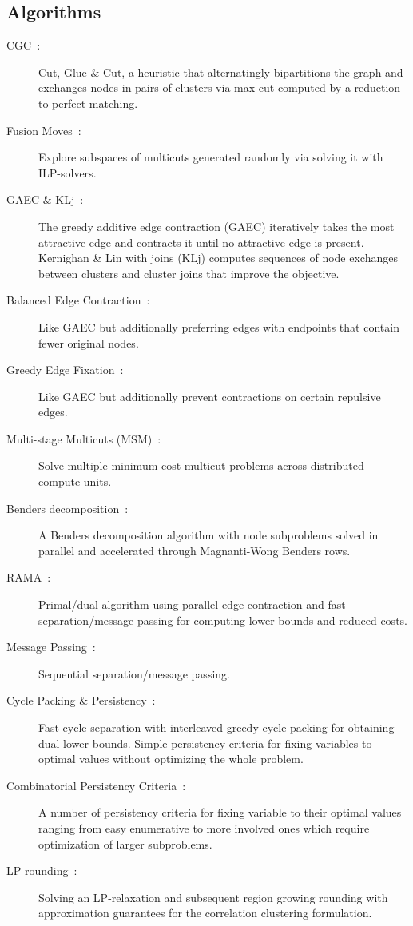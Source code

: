 \subsection{Algorithms}
\begin{description}
\item[CGC~\cite{beier2014cut}:] Cut, Glue \& Cut, a heuristic that alternatingly bipartitions the graph and exchanges nodes in pairs of clusters via max-cut computed by a reduction to perfect matching.
\item[Fusion Moves~\cite{beier2017multicut}:] Explore subspaces of multicuts generated randomly via solving it with ILP-solvers.
\item[GAEC \& KLj~\cite{keuper2015efficient}:] The greedy additive edge contraction (GAEC) iteratively takes the most attractive edge and contracts it until no attractive edge is present.
Kernighan \& Lin with joins (KLj) computes sequences of node exchanges between clusters and cluster joins that improve the objective.
\item[Balanced Edge Contraction~\cite{kardoost2018solving}:] Like GAEC but additionally preferring edges with endpoints that contain fewer original nodes.
\item[Greedy Edge Fixation~\cite{levinkov2019comparative}:] Like GAEC but additionally prevent contractions on certain repulsive edges.
\item[Multi-stage Multicuts (MSM)~\cite{ho2021msm}:] Solve multiple minimum cost multicut problems across distributed compute units.
\item[Benders decomposition~\cite{lukasik2020benders}:] A Benders decomposition algorithm with node subproblems solved in parallel and accelerated through Magnanti-Wong Benders rows.
\item[RAMA~\cite{abbas2021combinatorial}:] Primal/dual algorithm using parallel edge contraction and fast separation/message passing for computing lower bounds and reduced costs.
\item[Message Passing~\cite{swoboda2017message}:] Sequential separation/message passing.
\item[Cycle Packing \& Persistency~\cite{lange2018partial}:] Fast cycle separation with interleaved greedy cycle packing for obtaining dual lower bounds. Simple persistency criteria for fixing variables to optimal values without optimizing the whole problem.
\item[Combinatorial Persistency Criteria~\cite{lange2019combinatorial}:] A number of persistency criteria for fixing variable to their optimal values ranging from easy enumerative to more involved ones which require optimization of larger subproblems.
\item[LP-rounding~\cite{demaine2006correlation}:]
    Solving an LP-relaxation and subsequent region growing rounding with approximation guarantees for the correlation clustering formulation.
\end{description}
